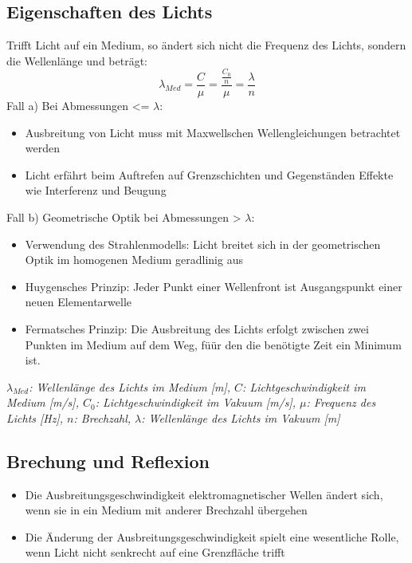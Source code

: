 \documentclass[a4paper,10pt]{article}
\newenvironment{displayformula}
{
	\begin{framed}
		\color{formulaColor}
	}
	{\end{framed}}
\newcommand{\formulalegend}[1]{%
	\par\vspace{0.5ex}%
	{{\color{legendColor}\RaggedRight\small\textit{#1}}}%
	\par\vspace{1.5ex}%
}
\begin{document}
\subsection{Eigenschaften des Lichts}

\begin{displayformula}
	Trifft Licht auf ein Medium, so ändert sich nicht die Frequenz des Lichts, sondern die Wellenlänge und beträgt:
	\[
	\lambda_{Med} = \frac{C}{\mu} = \frac{\frac{C_0}{n}}{\mu} = \frac{\lambda}{n}
	\]
	Fall a) Bei Abmessungen <= $\lambda$: \\
	\begin{itemize}
		\item Ausbreitung von Licht muss mit Maxwellschen Wellengleichungen betrachtet werden 
		\item Licht erfährt beim Auftrefen auf Grenzschichten und Gegenständen Effekte wie Interferenz und Beugung \\
	\end{itemize}
	
	Fall b) Geometrische Optik bei Abmessungen > $\lambda$: \\
	\begin{itemize}
		\item Verwendung des Strahlenmodells: Licht breitet sich in der geometrischen Optik im homogenen Medium geradlinig aus 
		\item Huygensches Prinzip: Jeder Punkt einer Wellenfront ist Ausgangspunkt einer neuen Elementarwelle
		\item Fermatsches Prinzip: Die Ausbreitung des Lichts erfolgt zwischen zwei Punkten im Medium auf dem Weg, füür den die benötigte Zeit ein Minimum ist.
	\end{itemize}

\end{displayformula}
\formulalegend{
	\( \lambda_{Med} \): Wellenlänge des Lichts im Medium [m], 
	\( C \): Lichtgeschwindigkeit im Medium [m/s], 
	\( C_0 \): Lichtgeschwindigkeit im Vakuum [m/s], 
	\( \mu \): Frequenz des Lichts [Hz], 
	\( n \): Brechzahl, 
	\( \lambda \): Wellenlänge des Lichts im Vakuum [m]
}


\subsection{Brechung und Reflexion}

\begin{displayformula}
	\begin{itemize}
		\item Die Ausbreitungsgeschwindigkeit elektromagnetischer Wellen ändert sich, wenn sie in ein Medium mit anderer Brechzahl übergehen
		\item Die Änderung der Ausbreitungsgeschwindigkeit spielt eine wesentliche Rolle, wenn Licht nicht senkrecht auf eine Grenzfläche trifft
	\end{itemize}
\end{displayformula}
\end{document}
